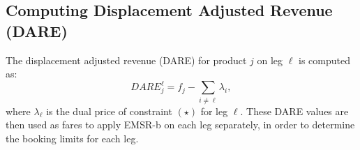 \documentclass{article}
\begin{document}
\subsection{Computing Displacement Adjusted Revenue (DARE)}
The displacement adjusted revenue (DARE) for product $j$ on leg $\ell$ is 
computed as:
\[
    DARE_j^\ell = f_j - \sum_{i \neq \ell} \lambda_i,
\]
where $\lambda_\ell$ is the dual price of constraint $(\star)$ for leg $\ell$. 
These DARE values are then used as fares to apply EMSR-b on each leg separately, 
in order to determine the booking limits for each leg.
\end{document}
